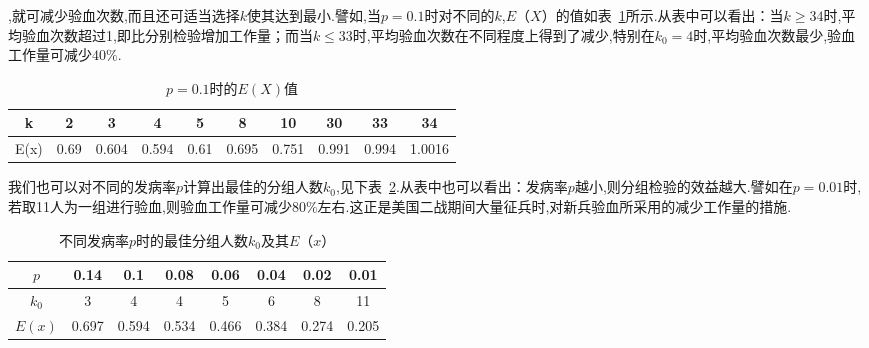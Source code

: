 ,就可减少验血次数,而且还可适当选择$ k $使其达到最小.譬如,当$ p=0.1 $时对不同的$ k $,$ E（X） $的值如表~\ref{tab:2.21}所示.从表中可以看出：当$k \geqslant 34$时,平均验血次数超过1,即比分别检验增加工作量；而当$k \leqslant 33$时,平均验血次数在不同程度上得到了减少,特别在$k_{0}=4$时,平均验血次数最少,验血工作量可减少$ 40\% $.

\begin{table}[htbp]
	\centering
	\caption{$ p=0.1 $时的$ E(X) $值}
	\begin{tabular}{c|ccccccccc}
		\toprule
		k     & 2     & 3     & 4     & 5     & 8     & 10    & 30    & 33    & 34 \\\midrule
		E(x)  & 0.69  & 0.604 & 0.594 & 0.61  & 0.695 & 0.751 & 0.991 & 0.994 & 1.0016 \\\bottomrule
	\end{tabular}%
	\label{tab:2.21}%
\end{table}%


我们也可以对不同的发病率$ p $计算出最佳的分组人数$ k_0 $,见下表~\ref{tab:2.2.2}.从表中也可以看出：发病率$ p $越小,则分组检验的效益越大.譬如在$ p=0.01 $时,若取11人为一组进行验血,则验血工作量可减少$ 80\% $左右.这正是美国二战期间大量征兵时,对新兵验血所采用的减少工作量的措施.

\begin{table}[htbp]
	\centering
	\caption{不同发病率$ p $时的最佳分组人数$ k_0 $及其$ E（x） $}
	\begin{tabular}{c|ccccccc}
		\toprule
		$ p $     & 0.14  & 0.1   & 0.08  & 0.06  & 0.04  & 0.02  & 0.01 \\\midrule
		$ k_0 $    & 3     & 4     & 4     & 5     & 6     & 8     & 11 \\\midrule
		$ E(x) $  & 0.697 & 0.594 & 0.534 & 0.466 & 0.384 & 0.274 & 0.205 \\\bottomrule
	\end{tabular}%
	\label{tab:2.2.2}%
\end{table}%

